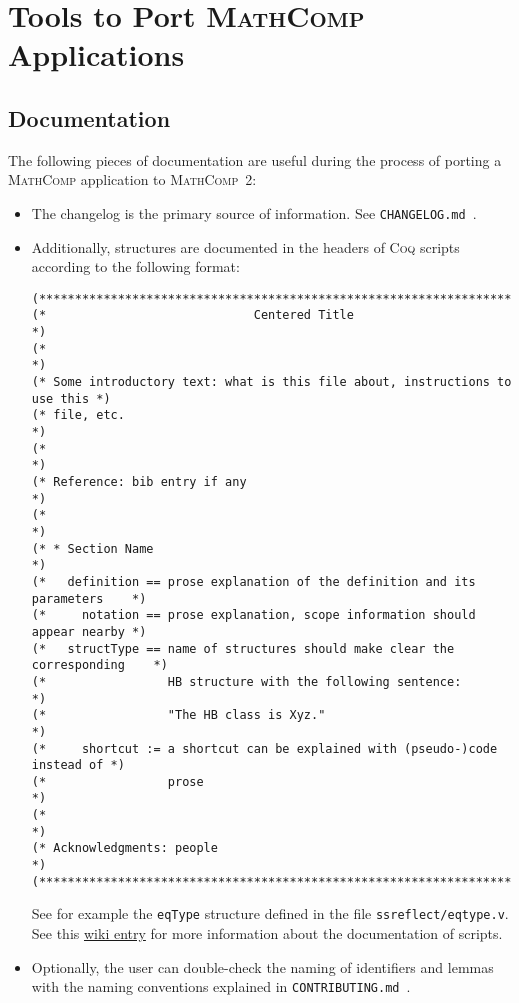 \documentclass{article}
\def\coq{\textsc{Coq}}
\def\mathcomp{\textsc{MathComp}}
\def\mathcomptwo{\mathcomp~2}
\def\coqin#1{\texttt{#1}}
\begin{document}
\section{Tools to Port \mathcomp{} Applications}
\label{sec:explore}

\subsection{Documentation}

The following pieces of documentation are useful during the process of
porting a \mathcomp{} application to \mathcomptwo:
\begin{itemize}
\item The changelog is the primary source of information. See \coqin{CHANGELOG.md}~\cite{mathcomp2}.
\item Additionally, structures are documented in the headers of \coq{} scripts
  according to the following format:
\begin{verbatim}
(*****************************************************************************)
(*                             Centered Title                                *)
(*                                                                           *)
(* Some introductory text: what is this file about, instructions to use this *)
(* file, etc.                                                                *)
(*                                                                           *)
(* Reference: bib entry if any                                               *)
(*                                                                           *)
(* * Section Name                                                            *)
(*   definition == prose explanation of the definition and its parameters    *)
(*     notation == prose explanation, scope information should appear nearby *)
(*   structType == name of structures should make clear the corresponding    *)
(*                 HB structure with the following sentence:                 *) 
(*                 "The HB class is Xyz."                                    *)
(*     shortcut := a shortcut can be explained with (pseudo-)code instead of *)
(*                 prose                                                     *)
(*                                                                           *)
(* Acknowledgments: people                                                   *)
(*****************************************************************************)    
\end{verbatim}
See for example the \coqin{eqType} structure defined in the file
\coqin{ssreflect/eqtype.v}.
%
See this
\href{https://github.com/math-comp/math-comp/wiki/How-to-document}{wiki
  entry} for more information about the documentation of scripts.
\item Optionally, the user can double-check the naming of identifiers
  and lemmas with the naming conventions explained in
  \coqin{CONTRIBUTING.md}~\cite{mathcomp2}.
\end{itemize}
\end{document}
